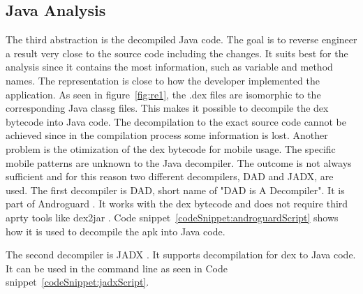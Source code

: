 \subsection{Java Analysis} \label{subsection:forensics-tools-java}
The third abstraction is the decompiled Java code.
The goal is to reverse engineer a result very close to the source code including the changes.
It suits best for the analysis since it contains the most information, such as variable and method names.
The representation is close to how the developer implemented the application.
\newline
As seen in figure~\ref{fig:re1}, the .dex files are isomorphic to the corresponding Java \gls{classg} files.
This makes it possible to decompile the dex bytecode into Java code.
The decompilation to the exact source code cannot be achieved since in the compilation process some information is lost.
Another problem is the otimization of the dex bytecode for mobile usage.
The specific mobile patterns are unknown to the Java decompiler.
The outcome is not always sufficient and for this reason two different decompilers, DAD and JADX, are used.
\newline
The first decompiler is DAD, short name of "DAD is A Decompiler".
It is part of Androguard \cite{androguard}.
It works with the dex bytecode and does not require third aprty tools like dex2jar \cite{dex2jar}.
Code snippet~\ref{codeSnippet:androguardScript} shows how it is used to decompile the \gls{apk} into Java code.
\newline

The second decompiler is JADX \cite{jadx}.
It supports decompilation for dex to Java code.
It can be used in the command line as seen in Code snippet~\ref{codeSnippet:jadxScript}.

